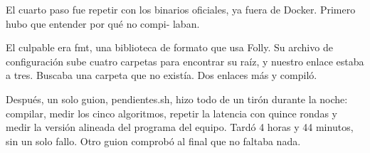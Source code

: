 El cuarto paso fue repetir con los binarios oficiales, ya fuera de Docker. Primero hubo que entender por qué no compi- laban.

El culpable era fmt, una biblioteca de formato que usa Folly. Su archivo de configuración sube cuatro carpetas para encontrar su raíz, y nuestro enlace estaba a tres. Buscaba una carpeta que no existía. Dos enlaces más y compiló.

Después, un solo guion, pendientes.sh, hizo todo de un tirón durante la noche: compilar, medir los cinco algoritmos, repetir la latencia con quince rondas y medir la versión alineada del programa del equipo. Tardó 4 horas y 44 minutos, sin un solo fallo. Otro guion comprobó al final que no faltaba nada.
